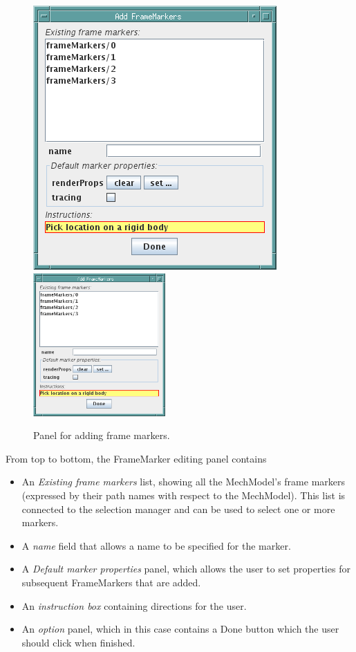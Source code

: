 \documentclass{article}
\begin{document}
\begin{figure}
\begin{center}
\iflatexml
\includegraphics[]{images/addFrameMarkersPanel}
\else
\includegraphics[width=0.45\textwidth]{images/addFrameMarkersPanel}
\fi
\end{center}
\caption{Panel for adding frame markers.}%
\label{addFrameMarkersPanelFig}
\end{figure}

From top to bottom, the FrameMarker editing panel contains

\begin{itemize}

\item An {\it Existing frame markers} list, showing all the MechModel's frame
markers (expressed by their path names with respect to the
MechModel). This list is connected to the selection manager and can be
used to select one or more markers.

\item A {\it name} field that allows a name to be specified for the marker.

\item A {\it Default marker properties} panel, which
allows the user to set properties for subsequent FrameMarkers that are added.

\item An {\it instruction box} containing directions for the user.

\item An {\it option} panel, which in this case contains a {\sf Done} button which
the user should click when finished.

\end{itemize}
\end{document}

